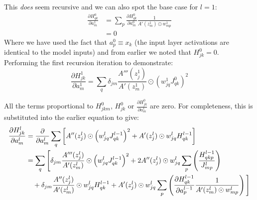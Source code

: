 \documentclass{article}
\begin{document}
This \textit{does} seem recursive and we can also spot the base case for \(l=1\):
\begin{align}
\frac{\partial H_{qk}^0}{\partial a_m^1} &= \sum_p \frac{\partial H_{qk}^0}{\partial a_m^0} \frac{1}{A'(z_m^1) \odot w_{mp}^1} \\
&= 0
\end{align}
Where we have used the fact that \(a_p^0 \equiv x_k\) (the input layer activations are identical to the model inputs) and from earlier we noted that \(H_{jk}^0 = 0\). Performing the first recursion iteration to demonstrate:
\begin{equation}
\frac{\partial H_{jk}^1}{\partial a_m^1} = \sum_q \delta_{jm} \frac{A'''(z_j^1)}{A'(z_m^1)} \odot \left( w_{jq}^1 J_{qk}^{0} \right)^2
\end{equation}

All the terms proportional to \(H_{jkm}^0\), \(H_{jk}^0\) or \(\frac{\partial H_{jk}^0}{\partial a_m^1}\) are zero. For completeness, this is substituted into the earlier equation to give:
\begin{align}
\frac{\partial H_{jk}^l}{\partial a_m^l} 
&= \frac{\partial}{\partial a_m^l} \sum_q \left[ A''(z_j^l) \odot \left( w_{jq}^l J_{qk}^{l-1} \right)^2 + A'(z_j^l) \odot w_{jq}^l H_{qk}^{l-1} \right] \\
&= \sum_q \Bigg[
    \delta_{jm} \frac{A'''(z_j^l)}{A'(z_m^l)} \odot \left( w_{jq}^l J_{qk}^{l-1} \right)^2
    + 2 A''(z_j^l) \odot w_{jq}^l \sum_p \left( \frac{H_{qkp}^{l-1}}{J_{mp}^l} \right) \notag \\
&\quad
    + \delta_{jm} \frac{A''(z_j^l)}{A'(z_m^l)} \odot w_{jq}^l H_{qk}^{l-1}
    + A'(z_j^l) \odot w_{jq}^l \sum_p \left( \frac{\partial H_{qk}^{l-1}}{\partial a_p^{l-1}} \frac{1}{A'(z_m^l) \odot w_{mp}^l} \right)
\Bigg]
\end{align}
\end{document}
